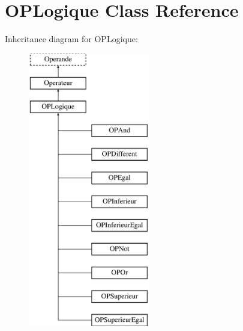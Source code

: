 \hypertarget{class_o_p_logique}{}\section{O\+P\+Logique Class Reference}
\label{class_o_p_logique}
Inheritance diagram for O\+P\+Logique\+:\begin{figure}[H]
\begin{center}
\leavevmode
\includegraphics[height=12.000000cm]{class_o_p_logique}
\end{center}
\end{figure}
